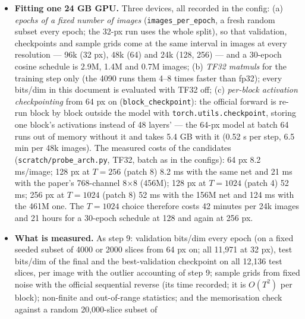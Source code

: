 \documentclass[11pt]{article}
\begin{document}
\begin{itemize}
        4 ($T = 1024$, $D = 16$, the paper's sequence length, the same
        156M-parameter transformer); 256 px with patch 8 ($T = 1024$, $D =
        64$, the paper's AFHQ-256 setting, same transformer). The 128- and
        256-px configurations were written after seeing the 64-px samples
        and are reported with whatever they produced.
  \item \textbf{Fitting one 24 GB GPU.} Three devices, all recorded in the
        config: (a) \emph{epochs of a fixed number of images}
        (\texttt{images\_per\_epoch}, a fresh random subset every epoch;
        the 32-px run uses the whole split), so that validation, checkpoints
        and sample grids come at the same interval in images at every
        resolution --- 96k (32 px), 48k (64) and 24k (128, 256) --- and a
        30-epoch cosine schedule is 2.9M, 1.4M and 0.7M images; (b)
        \emph{TF32 matmuls} for the training step only (the 4090 runs them
        4--8 times faster than fp32); every bits/dim in this document is
        evaluated with TF32 off; (c) \emph{per-block activation
        checkpointing} from 64 px on (\texttt{block\_checkpoint}): the
        official forward is re-run block by block outside the model with
        \texttt{torch.utils.checkpoint}, storing one block's activations
        instead of 48 layers' --- the 64-px model at batch 64 runs out of
        memory without it and takes 5.4 GB with it (0.52 s per step, 6.5
        min per 48k images). The measured costs of the candidates
        (\texttt{scratch/probe\_arch.py}, TF32, batch as in the configs):
        64 px 8.2 ms/image; 128 px at $T = 256$ (patch 8) 8.2 ms with the
        same net and 21 ms with the paper's 768-channel 8$\times$8 (456M);
        128 px at $T = 1024$ (patch 4) 52 ms; 256 px at $T = 1024$ (patch 8)
        52 ms with the 156M net and 124 ms with the 461M one. The $T = 1024$
        choice therefore costs 42 minutes per 24k images and 21 hours for a
        30-epoch schedule at 128 and again at 256 px.
  \item \textbf{What is measured.} As step 9: validation bits/dim every
        epoch (on a fixed seeded subset of 4000 or 2000 slices from 64 px
        on; all 11,971 at 32 px), test bits/dim of the final and the
        best-validation checkpoint on all 12,136 test slices, per image
        with the outlier accounting of step 9; sample grids from fixed
        noise with the official sequential reverse (its time recorded; it
        is $O(T^2)$ per block); non-finite and out-of-range statistics;
        and the memorisation check against a random 20,000-slice subset of

\end{itemize}
\end{document}
